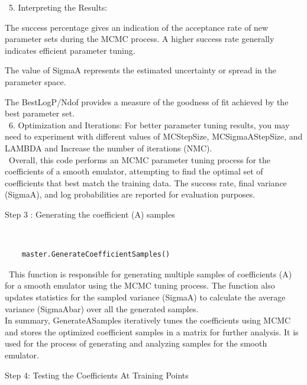 \documentclass[12pt]{article}
\numberwithin{equation}{section}
\numberwithin{figure}{section}
\begin{document}
\ 5. Interpreting the Results:

The success percentage gives an indication of the acceptance rate of new parameter sets during the MCMC process. A higher success rate generally indicates efficient parameter tuning.

The value of SigmaA represents the estimated uncertainty or spread in the parameter space.

The BestLogP/Ndof provides a measure of the goodness of fit achieved by the best parameter set. \\

\ 6. Optimization and Iterations:
For better parameter tuning results, you may need to experiment with different values of MCStepSize, MCSigmaAStepSize, and LAMBDA and Increase the number of iterations (NMC). \\

\ Overall, this code performs an MCMC parameter tuning process for the coefficients of a smooth emulator, attempting to find the optimal set of coefficients that best match the training data. The success rate, final variance (SigmaA), and log probabilities are reported for evaluation purposes. \\ 

\begin{description}
\item[Step 3 : Generating the coefficient (A) samples]
\end{description}

{\tt 
\begin{verbatim}
    master.GenerateCoefficientSamples()
\end{verbatim}
}

\ This function is responsible for generating multiple samples of coefficients (A) for a smooth emulator using the MCMC tuning process. The function also updates statistics for the sampled variance (SigmaA) to calculate the average variance (SigmaAbar) over all the generated samples. \\

In summary, GenerateASamples iteratively tunes the coefficients using MCMC and stores the optimized coefficient samples in a matrix for further analysis. It is used for the process of generating and analyzing samples for the smooth emulator.

\begin{description}
\item[Step 4: Testing the Coefficients At Training Points]
\end{description}
\end{document}
